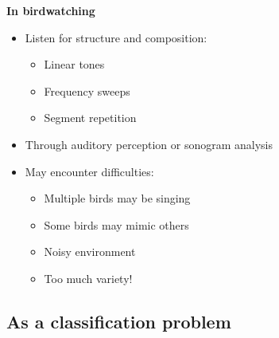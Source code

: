 \documentclass[t, xcolor={dvipsnames}]{beamer}
\begin{document}
\begin{frame}[fragile]
  \vspace{0.5cm}
  {\bfseries\Large In birdwatching}\\
  \vspace{0.5cm}
  \begin{addmargin}{0.5cm}
    \begin{itemize}
      \item Listen for structure and composition:
      \begin{itemize}
        \item Linear tones
        \item Frequency sweeps
        \item Segment repetition
      \end{itemize}
      \item Through auditory perception or sonogram analysis
      \item May encounter difficulties:
      \begin{itemize}
        \item Multiple birds may be singing
        \item Some birds may mimic others
        \item Noisy environment
        \item Too much variety!
      \end{itemize}
    \end{itemize}
  \end{addmargin}
\end{frame}


\subsection{As a classification problem}
\end{document}
